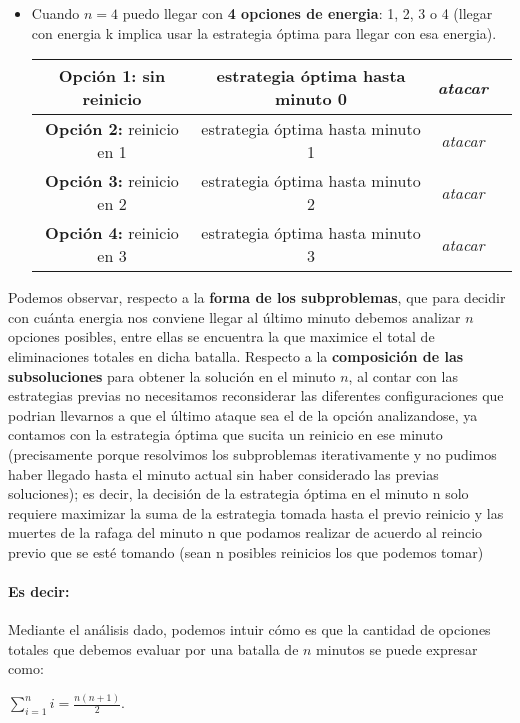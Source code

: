 \begin{itemize}
    \item Cuando $n=4$ puedo llegar con \textbf{4 opciones de energia}: 1, 2, 3 o 4 (llegar con energia k implica usar la estrategia óptima para llegar con esa energia).
        \begin{center}
        \begin{tabular}{ |c|c|c|c| }
        \hline
        \textbf{Opción 1:} sin reinicio& estrategia óptima hasta minuto 0& \textit{atacar} \\
        \hline
        \textbf{Opción 2:} reinicio en 1& estrategia óptima hasta minuto 1& \textit{atacar} \\
        \hline
        \textbf{Opción 3:} reinicio en 2& estrategia óptima hasta minuto 2& \textit{atacar} \\
        \hline
        \textbf{Opción 4:} reinicio en 3& estrategia óptima hasta minuto 3& \textit{atacar} \\
        \hline
        \end{tabular}
        \end{center}
\end{itemize}
Podemos observar, respecto a la \textbf{forma de los subproblemas}, que para decidir con cuánta energia nos conviene llegar al último minuto debemos analizar $n$ opciones posibles, entre ellas se encuentra la que maximice el total de eliminaciones totales en dicha batalla. Respecto a la \textbf{composición de las subsoluciones} para obtener la solución en el minuto $n$, al contar con las estrategias previas no necesitamos reconsiderar las diferentes configuraciones que podrian llevarnos a que el último ataque sea el de la opción analizandose, ya contamos con la estrategia óptima que sucita un reinicio en ese minuto (precisamente porque resolvimos los subproblemas iterativamente y no pudimos haber llegado hasta el minuto actual sin haber considerado las previas soluciones); es decir, la decisión de la estrategia óptima en el minuto n solo requiere maximizar la suma de la estrategia tomada hasta el previo reinicio y las muertes de la rafaga del minuto n que podamos realizar de acuerdo al reincio previo que se esté tomando (sean n posibles reinicios los que podemos tomar)


\paragraph{Es decir:} Mediante el análisis dado, podemos intuir cómo es que la cantidad de opciones totales que debemos evaluar por una batalla de $n$ minutos se puede expresar como: 
\begin{center}\label{eq:suamtoriaOpciones}
    $\sum_{i=1}^{n} i = \frac{n(n+1)}{2}$.
\end{center}

